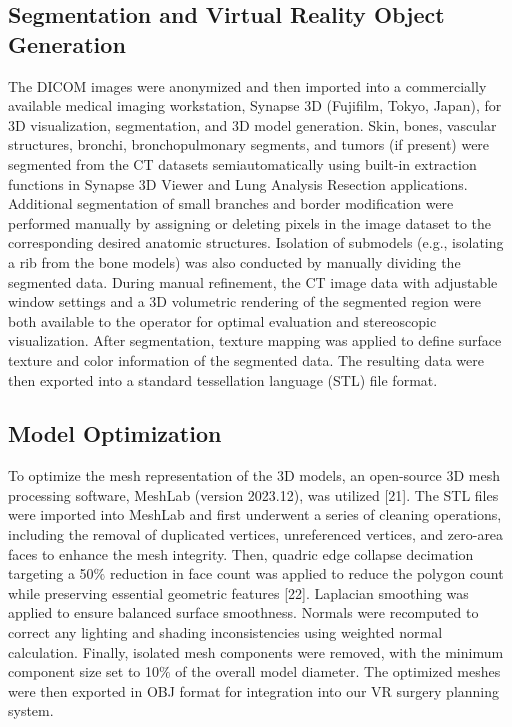 \documentclass{bmcart}
\begin{document}
\subsection{Segmentation and Virtual Reality Object Generation}
The DICOM images were anonymized and then imported into a commercially available medical imaging workstation, Synapse 3D (Fujifilm, Tokyo, Japan), for 3D visualization, segmentation, and 3D model generation. Skin, bones, vascular structures, bronchi, bronchopulmonary segments, and tumors (if present) were segmented from the CT datasets semiautomatically using built-in extraction functions in Synapse 3D Viewer and Lung Analysis Resection applications. Additional segmentation of small branches and border modification were performed manually by assigning or deleting pixels in the image dataset to the corresponding desired anatomic structures. Isolation of submodels (e.g., isolating a rib from the bone models) was also conducted by manually dividing the segmented data. During manual refinement, the CT image data with adjustable window settings and a 3D volumetric rendering of the segmented region were both available to the operator for optimal evaluation and stereoscopic visualization. After segmentation, texture mapping was applied to define surface texture and color information of the segmented data. The resulting data were then exported into a standard tessellation language (STL) file format.
\subsection{Model Optimization}
To optimize the mesh representation of the 3D models, an open-source 3D mesh processing software, MeshLab (version 2023.12), was utilized [21]. The STL files were imported into MeshLab and first underwent a series of cleaning operations, including the removal of duplicated vertices, unreferenced vertices, and zero-area faces to enhance the mesh integrity. Then, quadric edge collapse decimation targeting a 50$\%$ reduction in face count was applied to reduce the polygon count while preserving essential geometric features [22]. Laplacian smoothing was applied to ensure balanced surface smoothness. Normals were recomputed to correct any lighting and shading inconsistencies using weighted normal calculation. Finally, isolated mesh components were removed, with the minimum component size set to 10$\%$ of the overall model diameter. The optimized meshes were then exported in OBJ format for integration into our VR surgery planning system.
\end{document}
